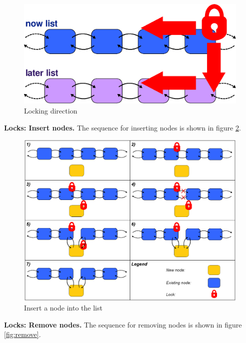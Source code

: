 \documentclass[letterpaper]{article}
\newcommand{\mypar}[1]{{\bf #1.}}
\begin{document}
\begin{figure}[h]\centering
  \includegraphics[scale=0.38]{locking.eps}
  \caption{Locking direction \label{fig:lock}}
\end{figure}

\mypar{Locks: Insert nodes}
The sequence for inserting nodes is shown in figure \ref{fig:insert}.

\begin{figure}[h]\centering
  \includegraphics[scale=0.31]{insert.eps}
  \caption{Insert a node into the list \label{fig:insert}}
\end{figure}

\mypar{Locks: Remove nodes}
The sequence for removing nodes is shown in  figure \ref{fig:remove}.
\end{document}
